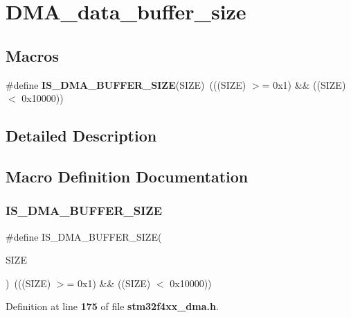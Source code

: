 \section{D\+M\+A\+\_\+data\+\_\+buffer\+\_\+size}
\label{group__DMA__data__buffer__size}
\subsection*{Macros}
\begin{DoxyCompactItemize}
\item 
\#define \textbf{ I\+S\+\_\+\+D\+M\+A\+\_\+\+B\+U\+F\+F\+E\+R\+\_\+\+S\+I\+ZE}(S\+I\+ZE)~(((S\+I\+ZE) $>$= 0x1) \&\& ((\+S\+I\+Z\+E) $<$ 0x10000))
\end{DoxyCompactItemize}


\subsection{Detailed Description}


\subsection{Macro Definition Documentation}
\mbox{\label{group__DMA__data__buffer__size_ga72ef4033bb3bc2cdfdbe579083b05e32}} 
\subsubsection{I\+S\+\_\+\+D\+M\+A\+\_\+\+B\+U\+F\+F\+E\+R\+\_\+\+S\+I\+ZE}
{\footnotesize\ttfamily \#define I\+S\+\_\+\+D\+M\+A\+\_\+\+B\+U\+F\+F\+E\+R\+\_\+\+S\+I\+ZE(\begin{DoxyParamCaption}\item[{}]{S\+I\+ZE }\end{DoxyParamCaption})~(((S\+I\+ZE) $>$= 0x1) \&\& ((\+S\+I\+Z\+E) $<$ 0x10000))}



Definition at line \textbf{ 175} of file \textbf{ stm32f4xx\+\_\+dma.\+h}.


